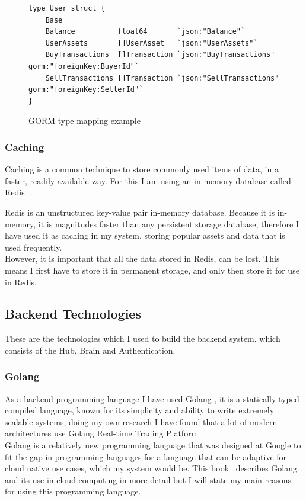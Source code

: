 \documentclass[titlepage]{article}
\begin{document}
\begin{figure}
  \begin{verbatim}
type User struct {
	Base
	Balance          float64       `json:"Balance"`
	UserAssets       []UserAsset   `json:"UserAssets"`
	BuyTransactions  []Transaction `json:"BuyTransactions" gorm:"foreignKey:BuyerId"`
	SellTransactions []Transaction `json:"SellTransactions" gorm:"foreignKey:SellerId"`
}
  \end{verbatim}
  \caption{GORM type mapping example}
  \label{gorm_orm}
\end{figure}

\subsubsection{Caching}
Caching is a common technique to store commonly used items of data, in a faster, readily available way. For this I am using an in-memory database called Redis~\cite{redis}.

Redis is an unstructured key-value pair in-memory database. Because it is in-memory, it is magnitudes faster than any persistent storage database, therefore I have used it as caching in my system, storing popular assets and data that is used frequently. \\
However, it is important that all the data stored in Redis, can be lost. This means I first have to store it in permanent storage, and only then store it for use in Redis. \\

\subsection{Backend Technologies}
These are the technologies which I used to build the backend system, which consists of the Hub, Brain and Authentication. \\

\subsubsection{Golang}
As a backend programming language I have used Golang , it is a statically typed compiled language, known for its simplicity and ability to write extremely scalable systems, doing my own research I have found that a lot of modern architectures use Golang Real-time Trading Platform \\

Golang is a relatively new programming language that was designed at Google to fit the gap in programming languages for a language that can be adaptive for cloud native use cases, which my system would be. This book~\cite{andrawos2017cloud} describes Golang and its use in cloud computing in more detail but I will state my main reasons for using this programming language.
\end{document}
